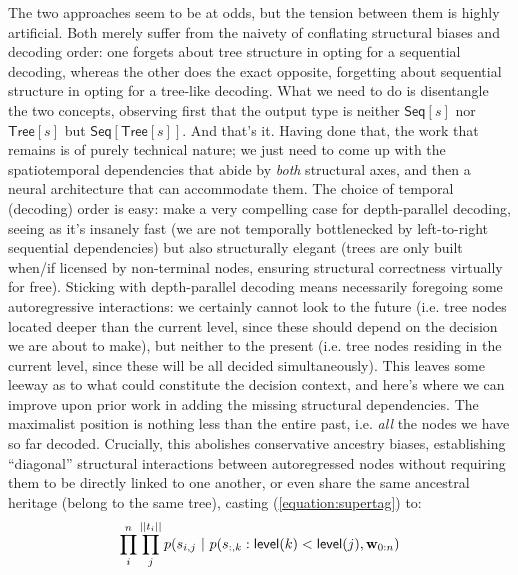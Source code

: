 The two approaches seem to be at odds, but the tension between them is highly artificial.
Both merely suffer from the naivety of conflating structural biases and decoding order: one forgets about tree structure in opting for a sequential decoding, whereas the other does the exact opposite, forgetting about sequential structure in opting for a tree-like decoding.
What we need to do is disentangle the two concepts, observing first that the output type is neither $\mathsf{Seq}[s]$ nor $\mathsf{Tree}[s]$ but $\mathsf{Seq}[\mathsf{Tree}[s]]$.
And that's it.
Having done that, the work that remains is of purely technical nature; we just need to come up with the spatiotemporal dependencies that abide by \textit{both} structural axes, and then a neural architecture that can accommodate them.
The choice of temporal (decoding) order is easy: \citet{prange-etal-2021-supertagging} make a very compelling case for depth-parallel decoding, seeing as it's insanely fast (we are not temporally bottlenecked by left-to-right sequential dependencies) but also structurally elegant (trees are only built when/if licensed by non-terminal nodes, ensuring structural correctness virtually for free).
Sticking with depth-parallel decoding means necessarily foregoing some autoregressive interactions: we certainly cannot look to the future (i.e. tree nodes located deeper than the current level, since these should depend on the decision we are about to make), but neither to the present (i.e. tree nodes residing in the current level, since these will be all decided simultaneously).
This leaves some leeway as to what could constitute the decision context, and here's where we can improve upon prior work in adding the missing structural dependencies.
The maximalist position is nothing less than the entire past, i.e. \textit{all} the nodes we have so far decoded.
Crucially, this abolishes conservative ancestry biases, establishing ``diagonal'' structural interactions between autoregressed nodes without requiring them to be directly linked to one another, or even share the same ancestral heritage (belong to the same tree), casting (\ref{equation:supertag}) to:
\begin{equation}
	\prod_i^n \prod_j^{||t_i||} p(s_{i, j} \ | \ p(s_{:, k} : \mathsf{level}(k) < \mathsf{level}(j), \wseq)
\end{equation}

